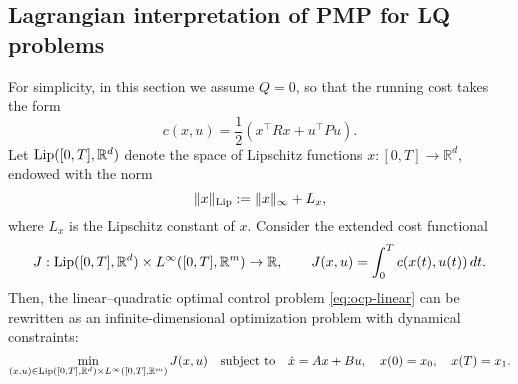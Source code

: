 

\subsection{Lagrangian interpretation of PMP for LQ problems}

For simplicity, in this section we assume $Q=0$, so that the running cost takes the form
\[
c(x,u) = \frac{1}{2} \left( x^\top R x + u^\top P u \right).
\]
Let $\operatorname{Lip}([0,T], \mathbb{R}^d)$ denote the space of Lipschitz functions $x:[0,T]\to \mathbb{R}^d$, endowed with the norm 
\[
\|x\|_{\operatorname{Lip}} := \|x\|_\infty + L_x,
\] 
where $L_x$ is the Lipschitz constant of $x$. Consider the extended cost functional
\begin{equation}
    J: \operatorname{Lip}([0,T],\mathbb{R}^d) \times L^\infty([0,T],\mathbb{R}^m) \to \mathbb{R}, 
    \qquad
    J(x,u) = \int_0^T c(x(t),u(t))\, dt.
\end{equation}
Then, the linear–quadratic optimal control problem \eqref{eq:ocp-linear} can be rewritten as an infinite-dimensional optimization problem with dynamical constraints:
\begin{equation}
    \min_{(x,u) \in \operatorname{Lip}([0,T],\mathbb{R}^d) \times L^\infty([0,T],\mathbb{R}^m)} 
    J(x,u)
    \quad \text{subject to} \quad
    \dot x = A x + B u, \quad x(0)=x_0, \quad x(T)=x_1.
\end{equation}

